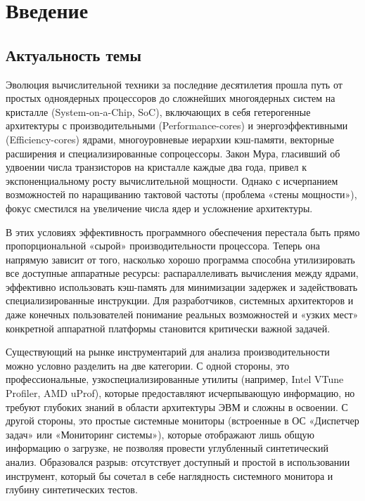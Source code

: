 \section*{Введение}

\subsection*{Актуальность темы}

Эволюция вычислительной техники за последние десятилетия прошла путь от простых одноядерных процессоров до сложнейших многоядерных систем на кристалле (System-on-a-Chip, SoC), включающих в себя гетерогенные архитектуры с производительными (Performance-cores) и энергоэффективными (Efficiency-cores) ядрами, многоуровневые иерархии кэш-памяти, векторные расширения и специализированные сопроцессоры. Закон Мура, гласивший об удвоении числа транзисторов на кристалле каждые два года, привел к экспоненциальному росту вычислительной мощности. Однако с исчерпанием возможностей по наращиванию тактовой частоты (проблема «стены мощности»), фокус сместился на увеличение числа ядер и усложнение архитектуры.

В этих условиях эффективность программного обеспечения перестала быть прямо пропорциональной «сырой» производительности процессора. Теперь она напрямую зависит от того, насколько хорошо программа способна утилизировать все доступные аппаратные ресурсы: распараллеливать вычисления между ядрами, эффективно использовать кэш-память для минимизации задержек и задействовать специализированные инструкции. Для разработчиков, системных архитекторов и даже конечных пользователей понимание реальных возможностей и «узких мест» конкретной аппаратной платформы становится критически важной задачей.

Существующий на рынке инструментарий для анализа производительности можно условно разделить на две категории. С одной стороны, это профессиональные, узкоспециализированные утилиты (например, Intel VTune Profiler, AMD uProf), которые предоставляют исчерпывающую информацию, но требуют глубоких знаний в области архитектуры ЭВМ и сложны в освоении. С другой стороны, это простые системные мониторы (встроенные в ОС «Диспетчер задач» или «Мониторинг системы»), которые отображают лишь общую информацию о загрузке, не позволяя провести углубленный синтетический анализ. Образовался разрыв: отсутствует доступный и простой в использовании инструмент, который бы сочетал в себе наглядность системного монитора и глубину синтетических тестов.

